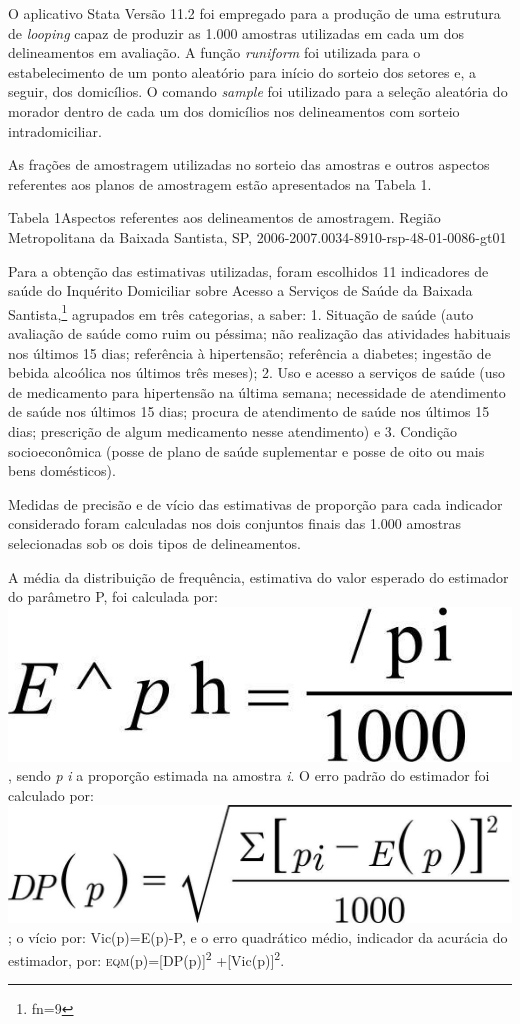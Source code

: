 \documentclass{article}
\makeatletter
\newcommand{\fn}{\afterassignment\fn@aux\count0=}
\newcommand{\fn@aux}{\csname fn\the\count0\endcsname}
\makeatother
\begin{document}
O aplicativo Stata Versão 11.2 foi empregado para a produção de uma estrutura de
\textit{looping}
capaz de produzir as 1.000 amostras utilizadas em cada um dos delineamentos em
avaliação. A função \textit{runiform}
foi utilizada para o estabelecimento de um ponto aleatório para início do
sorteio dos setores e, a seguir, dos domicílios. O comando \textit{sample}
foi utilizado para a seleção aleatória do morador dentro de cada um dos
domicílios nos delineamentos com sorteio intradomiciliar.

As frações de amostragem utilizadas no sorteio das amostras e outros aspectos
referentes aos planos de amostragem estão apresentados na Tabela 1.

Tabela 1Aspectos referentes aos delineamentos de amostragem. Região
Metropolitana da Baixada Santista, SP, 2006-2007.0034-8910-rsp-48-01-0086-gt01

Para a obtenção das estimativas utilizadas, foram escolhidos 11 indicadores de
saúde do Inquérito Domiciliar sobre Acesso a Serviços de Saúde da Baixada
Santista,\footnote{\fn9}
agrupados em três categorias, a saber: 1. Situação de saúde (auto avaliação de
saúde como ruim ou péssima; não realização das atividades habituais nos últimos
15 dias; referência à hipertensão; referência a diabetes; ingestão de bebida
alcoólica nos últimos três meses); 2. Uso e acesso a serviços de saúde (uso de
medicamento para hipertensão na última semana; necessidade de atendimento de
saúde nos últimos 15 dias; procura de atendimento de saúde nos últimos 15 dias;
prescrição de algum medicamento nesse atendimento) e 3. Condição socioeconômica
(posse de plano de saúde suplementar e posse de oito ou mais bens domésticos).

Medidas de precisão e de vício das estimativas de proporção para cada indicador
considerado foram calculadas nos dois conjuntos finais das 1.000 amostras
selecionadas sob os dois tipos de delineamentos.

A média da distribuição de frequência, estimativa do valor esperado do estimador
do parâmetro P, foi calculada por:
\includegraphics{0034-8910-rsp-48-01-0086-ii01}, sendo \textit{p}
\textit{i}
a proporção estimada na amostra\textit{ i}. O erro padrão do estimador foi calculado por:
\includegraphics{0034-8910-rsp-48-01-0086-ii02}; o vício por: Vic(p)=E(p)-P, e o
erro quadrático médio, indicador da acurácia do estimador, por:
\textsc{eqm}(p)=[DP(p)]\textsuperscript{2}
+[Vic(p)]\textsuperscript{2}.
\end{document}

